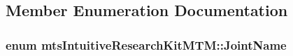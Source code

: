 \subsection{Member Enumeration Documentation}
\hypertarget{classmts_intuitive_research_kit_m_t_m_a76e15ff0552b14b45abb0aaa26cb122d}{
\subsubsection[{Joint\-Name}]{\setlength{\rightskip}{0pt plus 5cm}enum {\bf mts\-Intuitive\-Research\-Kit\-M\-T\-M\-::\-Joint\-Name}\hspace{0.3cm}{\ttfamily [protected]}}}\label{classmts_intuitive_research_kit_m_t_m_a76e15ff0552b14b45abb0aaa26cb122d}
